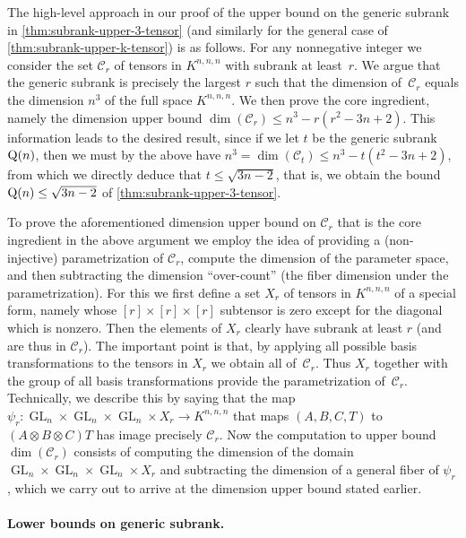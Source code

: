 \documentclass[11pt]{article}
\theoremstyle{definition}
\theoremstyle{remark}
\newcommand{\gensubrank}{{\rm Q}}
\newcommand{\GL}{\operatorname{GL}}
\begin{document}
The high-level approach in our proof of the upper bound on the generic subrank in \autoref{thm:subrank-upper-3-tensor} (and similarly for the general case of \autoref{thm:subrank-upper-k-tensor}) is as follows. For any nonnegative integer we consider the set $\mathcal{C}_r$ of tensors in $K^{n,n,n}$ with subrank at least~$r$. We argue that the generic subrank is precisely the largest $r$ such that the dimension of~$\mathcal{C}_r$ equals the dimension $n^3$ of the full space $K^{n,n,n}$. We then prove the core ingredient, namely the dimension upper bound $\dim(\mathcal{C}_r) \leq n^3 - r(r^2 - 3n + 2)$. This information leads to the desired result, since if we let $t$ be the generic subrank $\gensubrank(n)$, then we must by the above have $n^3 = \dim(\mathcal{C}_t) \leq n^3 - t(t^2 - 3n + 2)$, from which we directly deduce that $t\leq \sqrt{3n - 2}$, that is, we obtain the bound $\gensubrank(n) \leq \sqrt{3n-2}$ of \autoref{thm:subrank-upper-3-tensor}.

To prove the aforementioned dimension upper bound on $\mathcal{C}_r$ that is the core ingredient in the above argument we employ the idea of providing a (non-injective) parametrization of $\mathcal{C}_r$, compute the dimension of the parameter space, and then subtracting the dimension ``over-count'' (the fiber dimension under the parametrization). 
%
For this we first define a set $X_r$ of tensors in $K^{n,n,n}$ of a special form, namely whose $[r]\times [r]\times [r]$ subtensor is zero except for the diagonal which is nonzero. Then the elements of $X_r$ clearly have subrank at least $r$ (and are thus in $\mathcal{C}_r$). 
The important point is that, by applying all possible basis transformations to the tensors in $X_r$ we obtain all of~$\mathcal{C}_r$.
Thus $X_r$ together with the group of all basis transformations provide the parametrization of~$\mathcal{C}_r$.
Technically, we describe this by saying that the map $\psi_r : \GL_n \times \GL_n \times \GL_n \times X_r \to K^{n,n,n}$ that maps $(A, B, C, T)$ to $(A \otimes B \otimes C)T$ has image precisely $\mathcal{C}_r$. Now the computation to upper bound $\dim(\mathcal{C}_r)$ consists of computing the dimension of the domain $\GL_n \times \GL_n \times \GL_n \times X_r$ and subtracting the dimension of a general fiber of $\psi_r$, which we carry out to arrive at the dimension upper bound stated earlier.

\paragraph{Lower bounds on generic subrank.}
\end{document}
